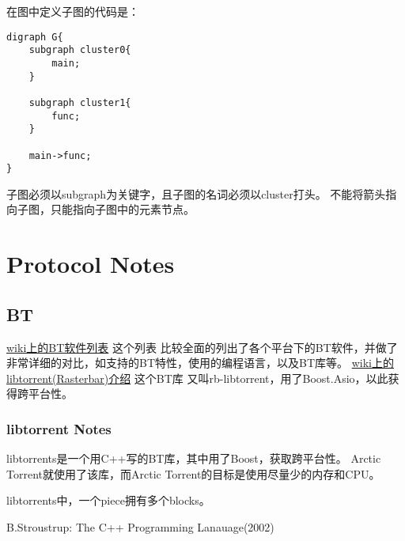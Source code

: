 \documentclass[a4paper,11pt,oneside,openany]{book}
\begin{document}
\begin{CJK*}{GBK}{song}
在图中定义子图的代码是：
\begin{verbatim}
digraph G{
    subgraph cluster0{
        main;
    }

    subgraph cluster1{
        func;
    }

    main->func;
}
\end{verbatim}
子图必须以subgraph为关键字，且子图的名词必须以cluster打头。
不能将箭头指向子图，只能指向子图中的元素节点。


\chapter{Protocol Notes}

\section{BT}
\noindent\href{http://en.wikipedia.org/wiki/Comparison\_of\_BitTorrent\_software}{wiki上的BT软件列表} 这个列表
比较全面的列出了各个平台下的BT软件，并做了非常详细的对比，如支持的BT特性，使用的编程语言，以及BT库等。
\noindent\href{http://en.wikipedia.org/wiki/Libtorrent\_(Rasterbar)}{wiki上的libtorrent(Rasterbar)介绍} 这个BT库
又叫rb-libtorrent，用了Boost.Asio，以此获得跨平台性。

\subsection{libtorrent Notes}
libtorrents是一个用C++写的BT库，其中用了Boost，获取跨平台性。
Arctic Torrent就使用了该库，而Arctic Torrent的目标是使用尽量少的内存和CPU。

libtorrents中，一个piece拥有多个blocks。



\clearpage      %
{}    %

\begin{thebibliography}{99}
 B.Stroustrup: The C++ Programming Lanauage(2002)
\end{thebibliography}

\clearpage      %
{}    %

\printindex

\end{CJK*}
\end{document}
